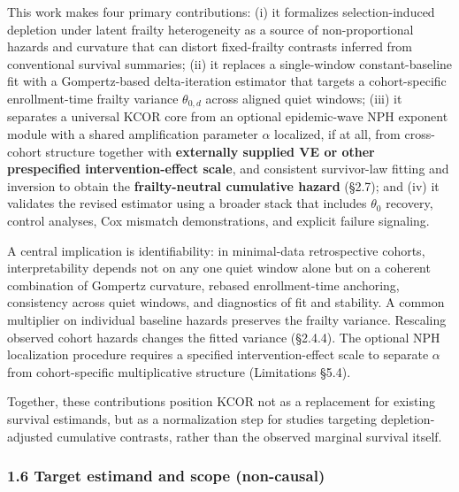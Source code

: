 \documentclass[
]{article}
\begin{document}
This work makes four primary contributions: (i) it formalizes selection-induced depletion under latent frailty heterogeneity as a source of non-proportional hazards and curvature that can distort fixed-frailty contrasts inferred from conventional survival summaries; (ii) it replaces a single-window constant-baseline fit with a Gompertz-based delta-iteration estimator that targets a cohort-specific enrollment-time frailty variance \(\theta_{0,d}\) across aligned quiet windows; (iii) it separates a universal KCOR core from an optional epidemic-wave NPH exponent module with a shared amplification parameter \(\alpha\) localized, if at all, from cross-cohort structure together with \textbf{externally supplied VE or other prespecified intervention-effect scale}, and consistent survivor-law fitting and inversion to obtain the \textbf{frailty-neutral cumulative hazard} (§2.7); and (iv) it validates the revised estimator using a broader stack that includes \(\theta_0\) recovery, control analyses, Cox mismatch demonstrations, and explicit failure signaling.

A central implication is identifiability: in minimal-data retrospective cohorts, interpretability depends not on any one quiet window alone but on a coherent combination of Gompertz curvature, rebased enrollment-time anchoring, consistency across quiet windows, and diagnostics of fit and stability. A common multiplier on individual baseline hazards preserves the frailty variance. Rescaling observed cohort hazards changes the fitted variance (§2.4.4). The optional NPH localization procedure requires a specified intervention-effect scale to separate \(\alpha\) from cohort-specific multiplicative structure (Limitations §5.4).

Together, these contributions position KCOR not as a replacement for existing survival estimands, but as a normalization step for studies targeting depletion-adjusted cumulative contrasts, rather than the observed marginal survival itself.

\subsubsection{1.6 Target estimand and scope (non-causal)}\label{target-estimand-and-scope-non-causal}
\end{document}
